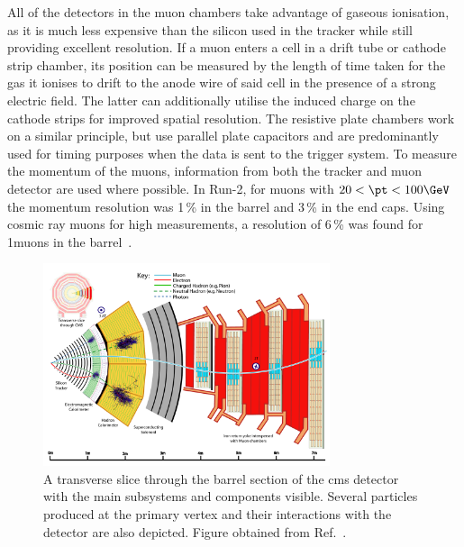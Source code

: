 All of the detectors in the muon chambers take advantage of gaseous ionisation, as it is much less expensive than the silicon used in the tracker while still providing excellent resolution. If a muon enters a cell in a drift tube or cathode strip chamber, its position can be measured by the length of time taken for the gas it ionises to drift to the anode wire of said cell in the presence of a strong electric field. The latter can additionally utilise the induced charge on the cathode strips for improved spatial resolution. The resistive plate chambers work on a similar principle, but use parallel plate capacitors and are predominantly used for timing purposes when the data is sent to the trigger system. To measure the momentum of the muons, information from both the tracker and muon detector are used where possible. In Run-2, for muons with $\text{20} < \pt < \text{100}\GeV$ the momentum resolution was 1\,\% in the barrel and 3\,\% in the end caps. Using cosmic ray muons for high \pt measurements, a resolution of 6\,\% was found for 1\TeV muons in the barrel~\cite{muon_detector_perf_2018}.

\begin{figure}[htbp]
    \centering
    \includegraphics[width=0.75\textwidth]{figures/Transverse_slice_CMS.pdf}
    \caption[A transverse slice through the barrel section of the CMS detector with the main subsystems and components visible]{A transverse slice through the barrel section of the \acrshort{cms} detector with the main subsystems and components visible. Several particles produced at the primary vertex and their interactions with the detector are also depicted. Figure obtained from Ref.~.}
    \label{fig:detector_cms_transverse}
\end{figure}



